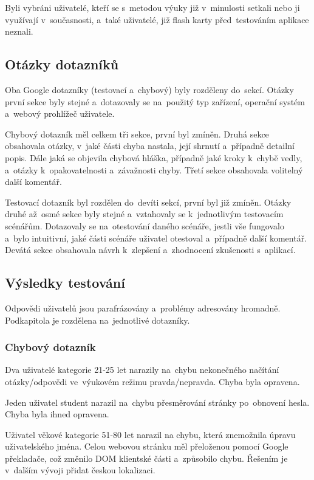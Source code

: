 \documentclass[twoside]{ctuthesis}
\begin{document}
Byli vybráni uživatelé, kteří se s~metodou výuky již v~minulosti setkali nebo ji využívají v~současnosti, a~také uživatelé, již flash karty před~testováním aplikace neznali.

\subsection{Otázky dotazníků}

Oba Google dotazníky (testovací a~chybový) byly rozděleny do~sekcí. Otázky první sekce byly stejné a~dotazovaly se na~použitý typ zařízení, operační systém a~webový prohlížeč uživatele.

Chybový dotazník měl celkem tři sekce, první byl zmíněn. Druhá sekce obsahovala otázky, v~jaké části chyba nastala, její shrnutí a~případně detailní popis. Dále jaká se objevila chybová hláška, případně jaké kroky k~chybě vedly, a~otázky k~opakovatelnosti a~závažnosti chyby. Třetí sekce obsahovala volitelný další komentář.

Testovací dotazník byl rozdělen do~devíti sekcí, první byl již zmíněn. Otázky druhé až~osmé sekce byly stejné a~vztahovaly se k~jednotlivým testovacím scénářům. Dotazovaly se na~otestování daného scénáře, jestli vše fungovalo a~bylo intuitivní, jaké části scénáře uživatel otestoval a~případně další komentář. Devátá sekce obsahovala návrh k~zlepšení a~zhodnocení zkušenosti s~aplikací.

\subsection{Výsledky testování}

Odpovědi uživatelů jsou parafrázovány a~problémy adresovány hromadně. Podkapitola je rozdělena na~jednotlivé dotazníky.

\subsubsection*{Chybový dotazník}

Dva uživatelé kategorie 21-25 let narazily na~chybu nekonečného načítání otázky/odpovědi ve~výukovém režimu pravda/nepravda. Chyba byla opravena.

Jeden uživatel student narazil na~chybu přesměrování stránky po~obnovení hesla. Chyba byla ihned opravena.

Uživatel věkové kategorie 51-80 let narazil na chybu, která znemožnila úpravu uživatelského jména. Celou webovou stránku měl přeloženou pomocí Google překladače, což změnilo DOM klientské části a~způsobilo chybu. Řešením je v~dalším vývoji přidat českou lokalizaci.
\end{document}
